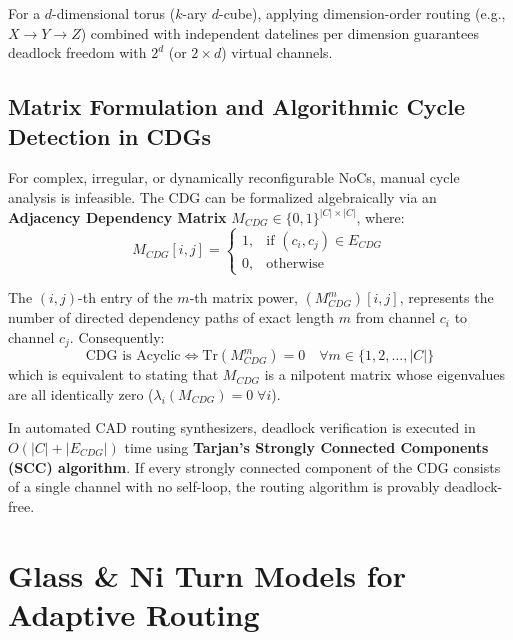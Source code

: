 For a $d$-dimensional torus ($k$-ary $d$-cube), applying dimension-order routing (e.g., $X \to Y \to Z$) combined with independent datelines per dimension guarantees deadlock freedom with $2^d$ (or $2 \times d$) virtual channels.

\subsection{Matrix Formulation and Algorithmic Cycle Detection in CDGs}
\label{subsec:ch5_cdg_matrix}

For complex, irregular, or dynamically reconfigurable NoCs, manual cycle analysis is infeasible. The CDG can be formalized algebraically via an \textbf{Adjacency Dependency Matrix} $M_{CDG} \in \{0, 1\}^{|C| \times |C|}$, where:
\begin{equation}
M_{CDG}[i, j] = 
\begin{cases}
1, & \text{if } (c_i, c_j) \in E_{CDG} \\
0, & \text{otherwise}
\end{cases}
\label{eq:ch5_matrix_def}
\end{equation}

The $(i, j)$-th entry of the $m$-th matrix power, $(M_{CDG}^m)[i, j]$, represents the number of directed dependency paths of exact length $m$ from channel $c_i$ to channel $c_j$. Consequently:
\begin{equation}
\text{CDG is Acyclic} \iff \text{Tr}(M_{CDG}^m) = 0 \quad \forall m \in \{1, 2, \dots, |C|\}
\label{eq:ch5_trace_nilpotent}
\end{equation}
which is equivalent to stating that $M_{CDG}$ is a nilpotent matrix whose eigenvalues are all identically zero ($\lambda_i(M_{CDG}) = 0 \;\forall i$).

In automated CAD routing synthesizers, deadlock verification is executed in $O(|C| + |E_{CDG}|)$ time using \textbf{Tarjan's Strongly Connected Components (SCC) algorithm}. If every strongly connected component of the CDG consists of a single channel with no self-loop, the routing algorithm is provably deadlock-free.

\section{Glass \& Ni Turn Models for Adaptive Routing}
\label{sec:ch5_turn_models}

